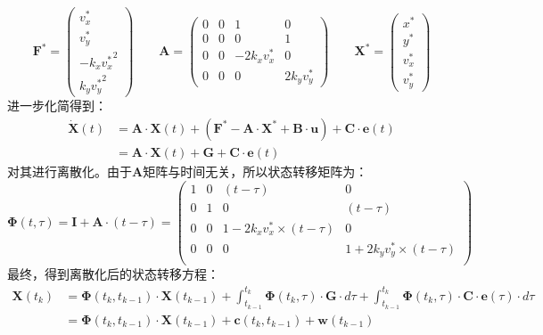 \documentclass[12pt, onecolumn]{article}
\begin{document}
	\begin{equation}
	\boldsymbol{F^*}=\begin{pmatrix}
		v_x^*\\
		v_y^*\\
		-k_x {v^*_x}^2\\
		k_y {v^*_y}^2
		\end{pmatrix}
	\qquad
	\boldsymbol{A}=\begin{pmatrix}
		0&0&1&0\\
		0&0&0&1\\
		0&0&-2 k_x v_x^*&0\\
		0&0&0&2 k_y v_y^*
		\end{pmatrix}
		\qquad
		\boldsymbol{X^*}=\begin{pmatrix}
			x^*\\y^*\\v_x^*\\v_y^*
			\end{pmatrix}
	\end{equation}
	进一步化简得到：
	\begin{equation}
	\begin{aligned}
	\dot{\boldsymbol{X}}(t)&=\boldsymbol{A}\cdot\boldsymbol{X}(t)
		+\left( \boldsymbol{F^*}-\boldsymbol{A}\cdot\boldsymbol{X^*}+\boldsymbol{B}\cdot\boldsymbol{u}\right) 
		+\boldsymbol{C}\cdot\boldsymbol{e}(t)
		\\
		&=\boldsymbol{A}\cdot\boldsymbol{X}(t)
				+\boldsymbol{G}
				+\boldsymbol{C}\cdot\boldsymbol{e}(t)
	\end{aligned}
	\end{equation}
	对其进行离散化。由于$\boldsymbol{A}$矩阵与时间无关，所以状态转移矩阵为：
	\begin{equation}
	\boldsymbol{\Phi}(t,\tau)=\boldsymbol{I}+\boldsymbol{A}\cdot(t-\tau)=
	\begin{pmatrix}
	1&0&(t-\tau)&0\\
	0&1&0&(t-\tau)\\
	0&0&1-2 k_x v_x^*\times(t-\tau)&0\\
	0&0&0&1+2 k_y v_y^*\times(t-\tau)\\
	\end{pmatrix}
	\end{equation}
	最终，得到离散化后的状态转移方程：
	\begin{equation}
	\begin{aligned}
	\boldsymbol{X}(t_k)&=\boldsymbol{\Phi}(t_k,t_{k-1})\cdot\boldsymbol{X}(t_{k-1})+\int_{t_{k-1}}^{t_k}\boldsymbol{\Phi}(t_k,\tau)\cdot\boldsymbol{G}\cdot d\tau
		+\int_{t_{k-1}}^{t_k}\boldsymbol{\Phi}(t_k,\tau)\cdot\boldsymbol{C}\cdot\boldsymbol{e}(\tau)\cdot d\tau
		\\&=\boldsymbol{\Phi}(t_k,t_{k-1})\cdot\boldsymbol{X}(t_{k-1})
		+\boldsymbol{c}(t_k,t_{k-1})
		+\boldsymbol{w}(t_{k-1})
	\end{aligned}
	\end{equation}
\end{document}
